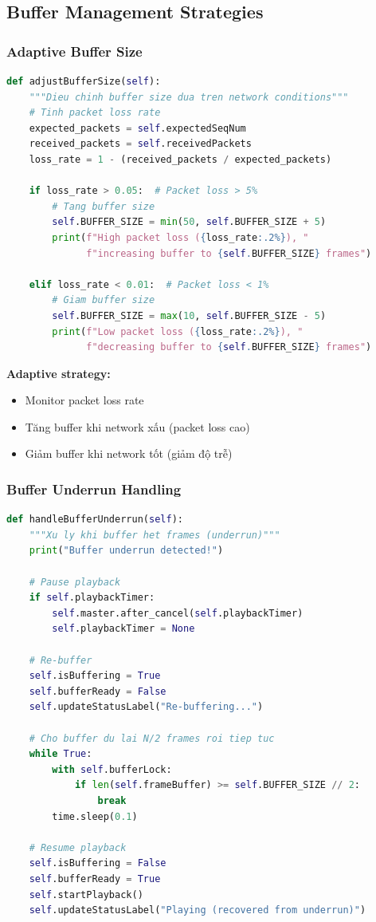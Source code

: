 \documentclass[a4paper,12pt]{article}
\begin{document}
\subsection{Buffer Management Strategies}

\subsubsection{Adaptive Buffer Size}

\begin{lstlisting}[language=Python, caption={Adaptive Buffering}]
def adjustBufferSize(self):
    """Dieu chinh buffer size dua tren network conditions"""
    # Tinh packet loss rate
    expected_packets = self.expectedSeqNum
    received_packets = self.receivedPackets
    loss_rate = 1 - (received_packets / expected_packets)
    
    if loss_rate > 0.05:  # Packet loss > 5%
        # Tang buffer size
        self.BUFFER_SIZE = min(50, self.BUFFER_SIZE + 5)
        print(f"High packet loss ({loss_rate:.2%}), "
              f"increasing buffer to {self.BUFFER_SIZE} frames")
    
    elif loss_rate < 0.01:  # Packet loss < 1%
        # Giam buffer size
        self.BUFFER_SIZE = max(10, self.BUFFER_SIZE - 5)
        print(f"Low packet loss ({loss_rate:.2%}), "
              f"decreasing buffer to {self.BUFFER_SIZE} frames")
\end{lstlisting}

\textbf{Adaptive strategy:}
\begin{itemize}
    \item Monitor packet loss rate
    \item Tăng buffer khi network xấu (packet loss cao)
    \item Giảm buffer khi network tốt (giảm độ trễ)
\end{itemize}

\subsubsection{Buffer Underrun Handling}

\begin{lstlisting}[language=Python, caption={Handle Buffer Underrun}]
def handleBufferUnderrun(self):
    """Xu ly khi buffer het frames (underrun)"""
    print("Buffer underrun detected!")
    
    # Pause playback
    if self.playbackTimer:
        self.master.after_cancel(self.playbackTimer)
        self.playbackTimer = None
    
    # Re-buffer
    self.isBuffering = True
    self.bufferReady = False
    self.updateStatusLabel("Re-buffering...")
    
    # Cho buffer du lai N/2 frames roi tiep tuc
    while True:
        with self.bufferLock:
            if len(self.frameBuffer) >= self.BUFFER_SIZE // 2:
                break
        time.sleep(0.1)
    
    # Resume playback
    self.isBuffering = False
    self.bufferReady = True
    self.startPlayback()
    self.updateStatusLabel("Playing (recovered from underrun)")
\end{lstlisting}
\end{document}
